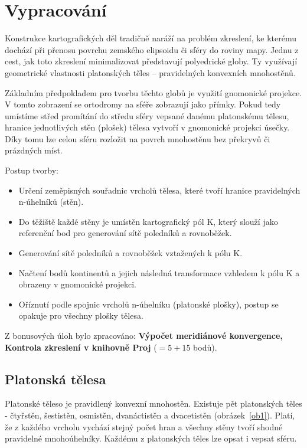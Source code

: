 \section{Vypracování}
Konstrukce kartografických děl tradičně naráží na problém zkreslení, ke kterému dochází při přenosu povrchu zemského elipsoidu či sféry do roviny mapy. Jednu z cest, jak toto zkreslení minimalizovat představují polyedrické globy. Ty využívají geometrické vlastnosti platonských těles – pravidelných konvexních mnohostěnů.

Základním předpokladem pro tvorbu těchto globů je využití gnomonické projekce. V tomto zobrazení se ortodromy na sféře zobrazují jako přímky. Pokud tedy umístíme střed promítání do středu sféry vepsané danému platonskému tělesu, hranice jednotlivých stěn (plošek) tělesa vytvoří v gnomonické projekci úsečky. Díky tomu lze celou sféru rozložit na povrch mnohostěnu bez překryvů či prázdných míst.

Postup tvorby: 
\begin{itemize}
    \item Určení zeměpisných souřadnic vrcholů tělesa, které tvoří hranice pravidelných n-úhelníků (stěn).
    \item Do těžiště každé stěny je umístěn kartografický pól K, který slouží jako referenční bod pro generování sítě poledníků a rovnoběžek.
    \item Generování sítě poledníků a rovnoběžek vztažených k pólu K.
    \item Načtení bodů kontinentů a jejich následná transformace vzhledem k pólu K a obrazeny v gnomonické projekci.
    \item Oříznutí podle spojnic vrcholů n-úhelníku (platonské plošky), postup se opakuje pro všechny plošky tělesa.
\end{itemize}

Z bonusových úloh bylo zpracováno: \textbf{Výpočet meridiánové konvergence, Kontrola zkreslení v knihovně Proj} ($=5 + 15$ bodů).
\newpage
\subsection{Platonská tělesa}
Platonské těleso je pravidlený konvexní mnohostěn. 
Existuje pět platonských těles - čtyřstěn, šestistěn, osmistěn, dvanáctistěn a dvacetistěn (obrázek~\ref {ob1}).
Platí, že z každého vrcholu vychází stejný počet hran a všechny stěny tvoří shodné pravidelné mnohoúhelníky.
Každému z platonských těles lze opsat i vepsat sféru. 


